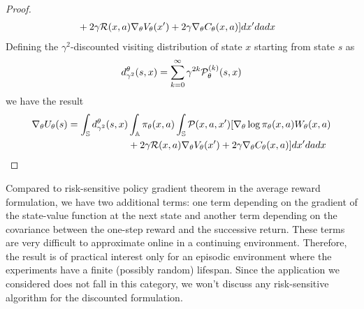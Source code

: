 \begin{proof}
\begin{equation*}
\begin{split}
						&+ 2 \gamma \mathcal{R}(x,a) \nabla_\theta V_\theta(x') + 2 \gamma \nabla_\theta C_\theta(x, a)]  dx' da dx
		\end{split}
	\end{equation*} 
	Defining the $\gamma^2$-discounted visiting distribution of state $x$ starting from state $s$ as
	\begin{equation*}
		d_{\gamma^2}^\theta(s, x) = \sum_{k=0}^{\infty} \gamma^{2k} \mathcal{P}_\theta^{(k)}(s, x)
	\end{equation*}
	we have the result
	\begin{equation*}
		\begin{split}
			\begin{split}
				\nabla_\theta U_\theta(s) = \int_{\mathbb{S}} d_{\gamma^2}^\theta(s, x) &\int_{\mathbb{A}} \pi_\theta(x,a) \int_{\mathbb{S}} \mathcal{P}(x,a,x') [\nabla_\theta \log \pi_\theta(x,a) W_\theta(x,a)\\ 
							&+ 2 \gamma \mathcal{R}(x,a) \nabla_\theta V_\theta(x') + 2 \gamma \nabla_\theta C_\theta(x, a)]  dx' da dx
			\end{split}
		\end{split}
	\end{equation*} 
\end{proof}
Compared to risk-sensitive policy gradient theorem in the average reward formulation, we have two additional terms: one term depending on the gradient of the state-value function at the next state and another term depending on the covariance between the one-step reward and the successive return. These terms are very difficult to approximate online in a continuing environment. Therefore, the result is of practical interest only for an episodic environment where the experiments have a finite (possibly random) lifespan. Since the application we considered does not fall in this category, we won't discuss any risk-sensitive algorithm for the discounted formulation. 

